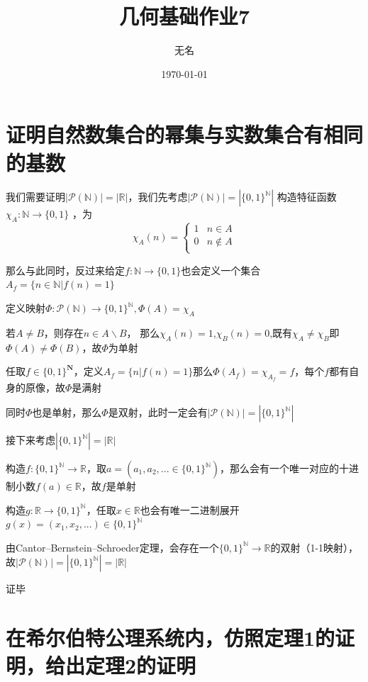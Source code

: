 \documentclass[12pt]{ctexart}
\title{几何基础作业7}
\author{无名}
\date{\today}
\begin{document}
\maketitle

\section{证明自然数集合的幂集与实数集合有相同的基数}
我们需要证明$\left\lvert \mathcal{P} (\mathbb{N} )\right\rvert=\left\lvert \mathbb{R} \right\rvert  $，我们先考虑$\left\lvert \mathcal{P} (\mathbb{N} )\right\rvert=\left\lvert \{0,1\}^\mathbb{N} \right\rvert  $
构造特征函数$\chi_A :\mathbb{N}\rightarrow \{0,1\}$ ，为
\[\chi_A(n)=\begin{cases}
    1&n\in A\\ 
    0&n\notin A\\
\end{cases}\]

那么与此同时，反过来给定$f:\mathbb{N} \rightarrow \{0,1\}$也会定义一个集合$A_f=\{n \in \mathbb{N}\vert f(n)=1\}$

定义映射$\Phi:\mathcal{P} (\mathbb{N} )\rightarrow \{0,1\}^\mathbb{N},\Phi(A)=\chi_A$

若$A\neq B$，则存在$n\in A\backslash  B$， 那么$\chi_A(n)=1$,$\chi_B(n)=0$,既有$\chi_A \neq \chi_B$即$\Phi(A)\neq \Phi(B)$，故$\Phi$为单射

任取$f\in \{0,1\}^\mathbf{N}$，定义$A_f=\{n\vert f(n)=1\}$那么$\Phi(A_f)=\chi_{A_f}=f$，每个$f$都有自身的原像，故$\Phi$是满射

同时$\Phi$也是单射，那么$\Phi$是双射，此时一定会有$\left\lvert \mathcal{P} (\mathbb{N} )\right\rvert=\left\lvert \{0,1\}^\mathbb{N} \right\rvert  $

接下来考虑$\left\lvert \{0,1\}^\mathbb{N} \right\rvert=  \left\lvert \mathbb{R}\right\rvert $

构造$f:\{0,1\}^\mathbb{N}\rightarrow\mathbb{R}$，取$a=(a_1,a_2,...\in\{0,1\}^\mathbb{N})$，那么会有一个唯一对应的十进制小数$f(a)\in \mathbb{R}$，故$f$是单射

构造$g:\mathbb{R}\rightarrow\{0,1\}^\mathbb{N}$，任取$x\in \mathbb{R}$也会有唯一二进制展开$g(x)=(x_1,x_2,...)\in \{0,1\}^\mathbb{N}$

由Cantor–Bernstein–Schroeder定理，会存在一个$\{0,1\}^\mathbb{N}\rightarrow\mathbb{R}$的双射（1-1映射），故$\left\lvert \mathcal{P} (\mathbb{N} )\right\rvert=\left\lvert \{0,1\}^\mathbb{N} \right\rvert=  \left\lvert \mathbb{R}\right\rvert $

证毕
\section{在希尔伯特公理系统内，仿照定理1的证明，给出定理2的证明}
\end{document}
